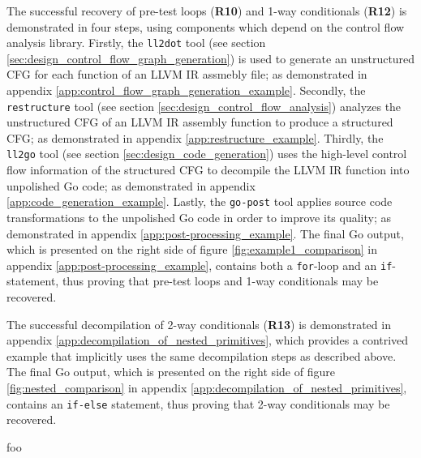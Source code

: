 
The successful recovery of pre-test loops (\textbf{R10}) and 1-way conditionals (\textbf{R12}) is demonstrated in four steps, using components which depend on the control flow analysis library. Firstly, the \texttt{ll2dot} tool (see section \ref{sec:design_control_flow_graph_generation}) is used to generate an unstructured CFG for each function of an LLVM IR assmebly file; as demonstrated in appendix \ref{app:control_flow_graph_generation_example}. Secondly, the \texttt{restructure} tool (see section \ref{sec:design_control_flow_analysis}) analyzes the unstructured CFG of an LLVM IR assembly function to produce a structured CFG; as demonstrated in appendix \ref{app:restructure_example}. Thirdly, the \texttt{ll2go} tool (see section \ref{sec:design_code_generation}) uses the high-level control flow information of the structured CFG to decompile the LLVM IR function into unpolished Go code; as demonstrated in appendix \ref{app:code_generation_example}. Lastly, the \texttt{go-post} tool applies source code transformations to the unpolished Go code in order to improve its quality; as demonstrated in appendix \ref{app:post-processing_example}. The final Go output, which is presented on the right side of figure \ref{fig:example1_comparison} in appendix \ref{app:post-processing_example}, contains both a \texttt{for}-loop and an \texttt{if}-statement, thus proving that pre-test loops and 1-way conditionals may be recovered.


The successful decompilation of 2-way conditionals (\textbf{R13}) is demonstrated in appendix \ref{app:decompilation_of_nested_primitives}, which provides a contrived example that implicitly uses the same decompilation steps as described above. The final Go output, which is presented on the right side of figure \ref{fig:nested_comparison} in appendix \ref{app:decompilation_of_nested_primitives}, contains an \texttt{if-else} statement, thus proving that 2-way conditionals may be recovered.


foo



